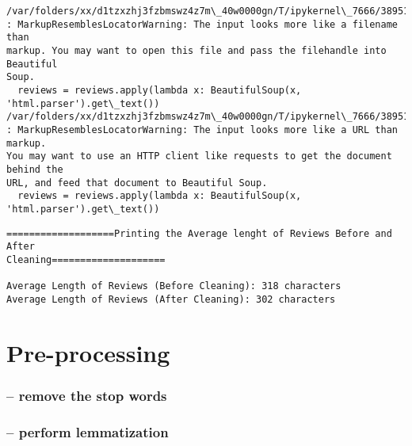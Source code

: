 \documentclass[11pt]{article}
\begin{document}
    \begin{Verbatim}[commandchars=\\\{\}]
/var/folders/xx/d1tzxzhj3fzbmswz4z7m\_40w0000gn/T/ipykernel\_7666/3895173410.py:75
: MarkupResemblesLocatorWarning: The input looks more like a filename than
markup. You may want to open this file and pass the filehandle into Beautiful
Soup.
  reviews = reviews.apply(lambda x: BeautifulSoup(x, 'html.parser').get\_text())
/var/folders/xx/d1tzxzhj3fzbmswz4z7m\_40w0000gn/T/ipykernel\_7666/3895173410.py:75
: MarkupResemblesLocatorWarning: The input looks more like a URL than markup.
You may want to use an HTTP client like requests to get the document behind the
URL, and feed that document to Beautiful Soup.
  reviews = reviews.apply(lambda x: BeautifulSoup(x, 'html.parser').get\_text())
    \end{Verbatim}

    \begin{Verbatim}[commandchars=\\\{\}]
===================Printing the Average lenght of Reviews Before and After
Cleaning====================

Average Length of Reviews (Before Cleaning): 318 characters
Average Length of Reviews (After Cleaning): 302 characters
    \end{Verbatim}

    \section{Pre-processing}\label{pre-processing}

\subsubsection{-- remove the stop words}\label{remove-the-stop-words}

\subsubsection{-- perform lemmatization}\label{perform-lemmatization}
\end{document}
